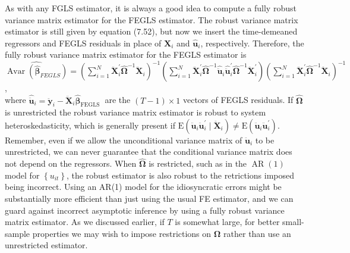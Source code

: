 \documentclass[10pt]{article}
\begin{document}
As with any FGLS estimator, it is always a good idea to compute a fully robust variance matrix estimator for the FEGLS estimator. The robust variance matrix estimator is still given by equation (7.52), but now we insert the time-demeaned regressors and FEGLS residuals in place of $\mathbf{X}_{i}$ and $\hat{\mathbf{u}}_{i}$, respectively. Therefore, the fully robust variance matrix estimator for the FEGLS estimator is\\
$\widehat{\operatorname{Avar}\left(\hat{\boldsymbol{\beta}}_{F E G L S}\right)}=\left(\sum_{i=1}^{N} \ddot{\mathbf{X}}_{i}^{\prime} \hat{\boldsymbol{\Omega}}^{-1} \ddot{\mathbf{X}}_{i}\right)^{-1}\left(\sum_{i=1}^{N} \ddot{\mathbf{X}}_{i}^{\prime} \hat{\boldsymbol{\Omega}}^{-1} \hat{\ddot{\mathbf{u}}}_{i} \hat{\ddot{\mathbf{u}}}_{i}^{\prime} \hat{\boldsymbol{\Omega}}^{-1} \ddot{\mathbf{X}}_{i}^{\prime}\right)\left(\sum_{i=1}^{N} \ddot{\mathbf{X}}_{i}^{\prime} \hat{\boldsymbol{\Omega}}^{-1} \ddot{\mathbf{X}}_{i}\right)^{-1}$,\\
where $\hat{\ddot{\mathbf{u}}}_{i}=\ddot{\mathbf{y}}_{i}-\ddot{\mathbf{X}}_{i} \hat{\boldsymbol{\beta}}_{\text {FEGLS }}$ are the $(T-1) \times 1$ vectors of FEGLS residuals. If $\hat{\boldsymbol{\Omega}}$ is unrestricted the robust variance matrix estimator is robust to system heteroskedasticity, which is generally present if $\mathrm{E}\left(\ddot{\mathbf{u}}_{i} \ddot{\mathbf{u}}_{i}^{\prime} \mid \ddot{\mathbf{X}}_{i}\right) \neq \mathrm{E}\left(\ddot{\mathbf{u}}_{i} \ddot{\mathbf{u}}_{i}^{\prime}\right)$. Remember, even if we allow the unconditional variance matrix of $\ddot{\mathbf{u}}_{i}$ to be unrestricted, we can never guarantee that the conditional variance matrix does not depend on the regressors. When $\hat{\boldsymbol{\Omega}}$ is restricted, such as in the $\operatorname{AR}(1)$ model for $\left\{u_{i t}\right\}$, the robust estimator is also robust to the retrictions imposed being incorrect. Using an AR(1) model for the idiosyncratic errors might be substantially more efficient than just using the usual FE estimator, and we can guard against incorrect asymptotic inference by using a fully robust variance matrix estimator. As we discussed earlier, if $T$ is somewhat large, for better small-sample properties we may wish to impose restrictions on $\boldsymbol{\Omega}$ rather than use an unrestricted estimator.
\end{document}
